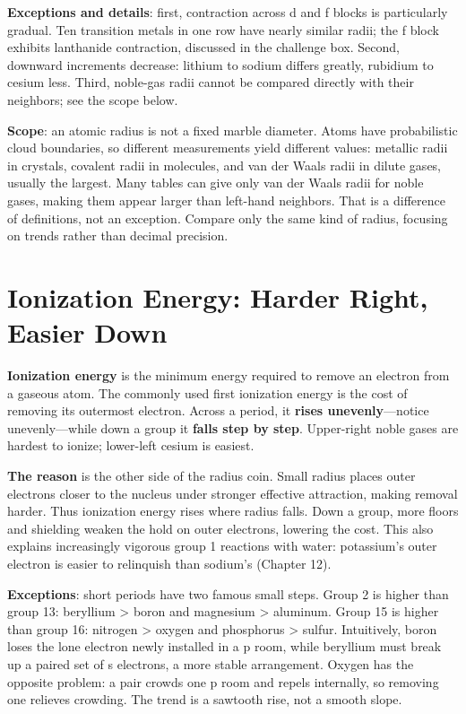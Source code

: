 \textbf{Exceptions and details}: first, contraction across d and f blocks is particularly gradual. Ten transition metals in one row have nearly similar radii; the f block exhibits lanthanide contraction, discussed in the challenge box. Second, downward increments decrease: lithium to sodium differs greatly, rubidium to cesium less. Third, noble-gas radii cannot be compared directly with their neighbors; see the scope below.

\textbf{Scope}: an atomic radius is not a fixed marble diameter. Atoms have probabilistic cloud boundaries, so different measurements yield different values: metallic radii in crystals, covalent radii in molecules, and van der Waals radii in dilute gases, usually the largest. Many tables can give only van der Waals radii for noble gases, making them appear larger than left-hand neighbors. That is a difference of definitions, not an exception. Compare only the same kind of radius, focusing on trends rather than decimal precision.

\section{Ionization Energy: Harder Right, Easier Down}

\textbf{Ionization energy} is the minimum energy required to remove an electron from a gaseous atom. The commonly used first ionization energy is the cost of removing its outermost electron. Across a period, it \textbf{rises unevenly}---notice unevenly---while down a group it \textbf{falls step by step}. Upper-right noble gases are hardest to ionize; lower-left cesium is easiest.

\textbf{The reason} is the other side of the radius coin. Small radius places outer electrons closer to the nucleus under stronger effective attraction, making removal harder. Thus ionization energy rises where radius falls. Down a group, more floors and shielding weaken the hold on outer electrons, lowering the cost. This also explains increasingly vigorous group 1 reactions with water: potassium's outer electron is easier to relinquish than sodium's (Chapter 12).

\textbf{Exceptions}: short periods have two famous small steps. Group 2 is higher than group 13: beryllium > boron and magnesium > aluminum. Group 15 is higher than group 16: nitrogen > oxygen and phosphorus > sulfur. Intuitively, boron loses the lone electron newly installed in a p room, while beryllium must break up a paired set of s electrons, a more stable arrangement. Oxygen has the opposite problem: a pair crowds one p room and repels internally, so removing one relieves crowding. The trend is a sawtooth rise, not a smooth slope.

